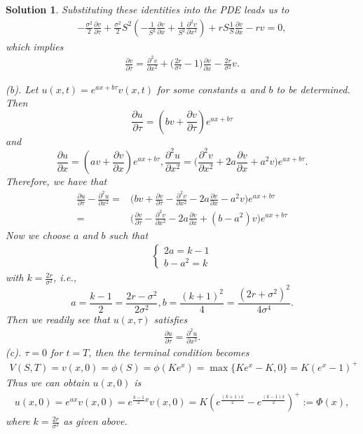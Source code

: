 \documentclass[6pt]{article}
\newtheorem{solution}{Solution}
\numberwithin{equation}{section}
\begin{document}
\begin{enumerate}
\begin{solution}
Substituting these identities into the PDE leads us to
\begin{align*}
-\frac{\sigma^2}{2}\frac{\partial v}{\partial\tau}+\frac{\sigma^2}{2}S^2(-\frac{1}{S^2}\frac{\partial v}{\partial x}+\frac{1}{S^2}\frac{\partial^2 v}{\partial x^2})+rS\frac{1}{S}\frac{\partial v}{\partial x}-rv=0,
\end{align*}
which implies
\begin{align*}
\frac{\partial v}{\partial \tau}=\frac{\partial^2 v}{\partial x^2}+\Big(\frac{2r}{\sigma^2}-1\Big)\frac{\partial v}{\partial x}-\frac{2r}{\sigma^2}v.
\end{align*}


(b). Let $u(x,t)=e^{ax+b\tau}v(x,t)$ for some constants $a$ and $b$ to be determined.  Then
\[\frac{\partial u}{\partial \tau}=(bv+\frac{\partial v}{\partial \tau})e^{ax+b\tau}\]
and
\[\frac{\partial u}{\partial x}=(av+\frac{\partial v}{\partial x})e^{ax+b\tau}, \frac{\partial^2 u}{\partial x^2}=\Big(\frac{\partial^2 v}{\partial x^2}+2a\frac{\partial v}{\partial x}+a^2v\Big)e^{ax+b\tau}.\]
Therefore, we have that
\begin{align*}
\frac{\partial u}{\partial \tau}-\frac{\partial^2 u}{\partial x^2}=&\Big(bv+\frac{\partial v}{\partial \tau}-\frac{\partial^2 v}{\partial x^2}-2a\frac{\partial v}{\partial x}-a^2v\Big)e^{ax+b\tau}\\
=&\Big(\frac{\partial v}{\partial \tau}-\frac{\partial^2 v}{\partial x^2}-2a\frac{\partial v}{\partial x}+(b-a^2)v\Big)e^{ax+b\tau}
\end{align*}
Now we choose $a$ and $b$ such that
\begin{align*}
\begin{cases}
2a=k-1\\
b-a^2=k
\end{cases}
\end{align*}
with $k=\frac{2r}{\sigma^2}$, i.e.,
\[a=\frac{k-1}{2}=\frac{2r-\sigma^2}{2\sigma^2}, b=\frac{(k+1)^2}{4}=\frac{(2r+\sigma^2)^2}{4\sigma^4}.\]
Then we readily see that $u(x,\tau)$ satisfies
\begin{align*}
\frac{\partial u}{\partial \tau}=\frac{\partial^2 u}{\partial x^2}.
\end{align*}
(c). $\tau=0$ for $t=T$, then the terminal condition becomes
\begin{align*}
V(S,T)=v(x,0)=\phi(S)=\phi(Ke^x)=\max{\{Ke^x-K,0\}}=K(e^x-1)^{+}
\end{align*}
Thus we can obtain $u(x,0)$ is
\begin{align*}
u(x,0)=e^{ax}v(x,0)=e^{\frac{k-1}{2} x}v(x,0)=K(e^{\frac{(k+1)x}{2}}-e^{\frac{(k-1)x}{2}})^{+}:=\Phi(x),
\end{align*}
where $k=\frac{2r}{\sigma^2}$ as given above.


\end{solution}
\end{enumerate}
\end{document}
